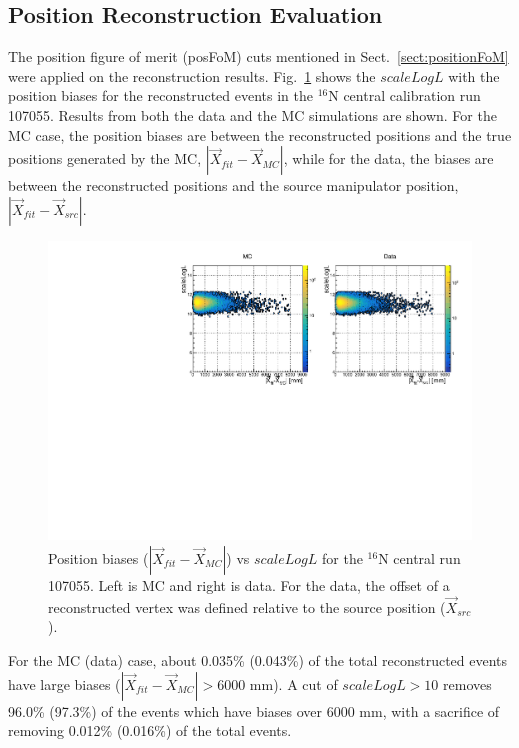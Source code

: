 \subsection{Position Reconstruction Evaluation}

The position figure of merit (posFoM) cuts mentioned in Sect.~\ref{sect:positionFoM} were applied on the reconstruction results. Fig.~\ref{posBiasVsFOM} shows the $scaleLogL$ with the position biases for the reconstructed events in the $^{16}$N central calibration run 107055. Results from both the data and the MC simulations are shown. For the MC case, the position biases are between the reconstructed positions and the true positions generated by the MC, $|\vec{X}_{fit}-\vec{X}_{MC}|$, while for the data, the biases are between the reconstructed positions and the source manipulator position, $|\vec{X}_{fit}-\vec{X}_{src}|$.

\begin{figure}
	\centering
	\includegraphics[width=13cm]{N16_107055_scaleLogLvsPosBias.pdf}
	\caption[Position biases vs $scaleLogL$ for the $^{16}$N central run 107055.]{Position biases ($|\vec{X}_{fit}-\vec{X}_{MC}|$) vs $scaleLogL$ for the $^{16}$N central run 107055. Left is MC and right is data. For the data, the offset of a reconstructed vertex was defined relative to the source position ($\vec{X}_{src}$).\label{posBiasVsFOM}}
\end{figure}

For the MC (data) case, about 0.035\% (0.043\%) of the total reconstructed events have large biases ($|\vec{X}_{fit}-\vec{X}_{MC}|>6000$ mm). A cut of $scaleLogL>10$ removes 96.0\% (97.3\%) of the events which have biases over 6000 mm, with a sacrifice of removing 0.012\% (0.016\%) of the total events.

